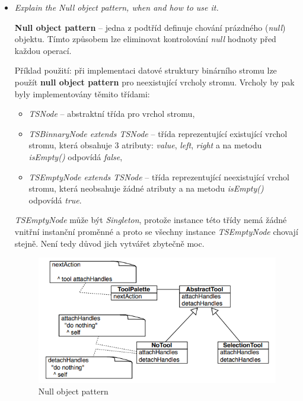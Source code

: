 \documentclass{szzclass}
\begin{document}
\begin{itemize}
      \item \textit{Explain the Null object pattern, when and how to use it.}

      \textbf{Null object pattern} -- jedna z podtříd definuje chování prázdného (\textit{null}) objektu.
      Tímto způsobem lze eliminovat kontrolování \textit{null} hodnoty před každou operací.

      Příklad použití: při implementaci datové struktury binárního stromu lze použít \textbf{null object pattern}
      pro neexistující vrcholy stromu. Vrcholy by pak byly implementovány těmito třídami:

      \begin{itemize}
            \item \textit{TSNode} -- abstraktní třída pro vrchol stromu,

            \item \textit{TSBinnaryNode extends TSNode} -- třída reprezentující existující vrchol stromu,
            která obsahuje 3 atributy: \textit{value}, \textit{left}, \textit{right} a na metodu
            \textit{isEmpty()} odpovídá \textit{false},

            \item \textit{TSEmptyNode extends TSNode} -- třída reprezentující neexistující vrchol stromu,
            která neobsahuje žádné atributy a na metodu
            \textit{isEmpty()} odpovídá \textit{true}.

      \end{itemize}

      \textit{TSEmptyNode} může být \textit{Singleton}, protože instance této třídy nemá žádné vnitřní
      instanční proměnné a proto se všechny instance \textit{TSEmptyNode} chovají stejně. Není tedy důvod
      jich vytvářet zbytečně moc.

      \begin{figure}[h]
            \centering
            \includegraphics[width=1\textwidth]{topics/bi-wsi-si-10/null.png}
            \caption{Null object pattern}
      \end{figure}



\end{itemize}
\end{document}
